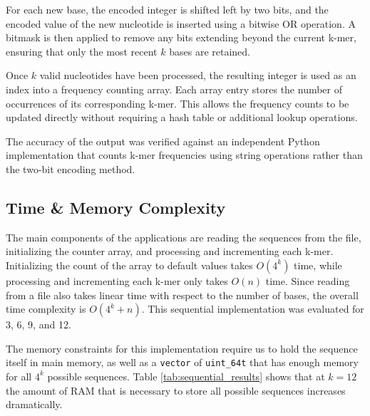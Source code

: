 \documentclass{article}
\begin{document}
For each new base, the encoded integer is shifted left by two bits, and the encoded value of the new
nucleotide is inserted using a bitwise OR operation. A bitmask is then applied to remove any bits extending
beyond the current k-mer, ensuring that only the most recent $k$ bases are retained.

\vspace{\baselineskip}

Once $k$ valid nucleotides have been processed, the resulting integer is used as an index into a frequency
counting array. Each array entry stores the number of occurrences of its corresponding k-mer. This allows
the frequency counts to be updated directly without requiring a hash table or additional lookup operations.

\vspace{\baselineskip}

The accuracy of the output was verified against an independent Python implementation that
counts k-mer frequencies using string operations rather than the two-bit encoding method.

\vspace{\baselineskip}

\subsection{Time \& Memory Complexity}

\vspace{\baselineskip}

The main components of the applications are reading the sequences from the file, initializing the counter array, and processing and incrementing each k-mer. 
Initializing the count of the array to default values takes $O(4^k)$ time, while processing and incrementing each k-mer only takes $O(n)$ time. Since reading 
from a file also takes linear time with respect to the number of bases, the overall time complexity is $O(4^k + n)$. This sequential implementation was 
evaluated for 3, 6, 9, and 12.

\vspace{\baselineskip}

The memory constraints for this implementation require us to hold the sequence itself in main memory, as well as a \texttt{vector} of \texttt{uint\_64t} 
that has enough memory for all $4^k$ possible sequences. Table \ref{tab:sequential_results} shows that at $k=12$ the amount of RAM that is necessary to store 
all possible sequences increases dramatically.
\end{document}
